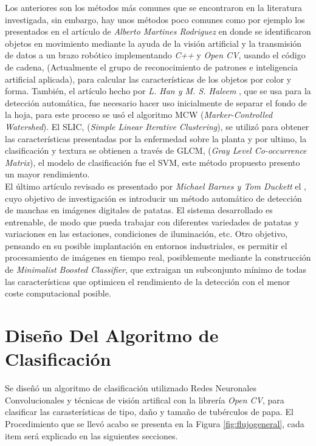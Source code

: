 	Los anteriores son los métodos más comunes que se encontraron en la literatura investigada, sin embargo, hay unos métodos poco comunes como por ejemplo los presentados en el artículo de \textit{Alberto Martines Rodriguez} \cite{article5} en donde se identificaron objetos en movimiento mediante la ayuda de la visión artificial y la transmisión de datos a un brazo robótico implementando \textit{C++} y \textit{Open CV}, usando el código de cadena, (Actualmente el grupo de reconocimiento de patrones e inteligencia artificial aplicada), para calcular las características de los objetos por color y forma. También, el artículo hecho por \textit{L. Han y M. S. Haleem} \cite{7237209}, que se usa para la detección automática, fue necesario hacer uso inicialmente de separar el fondo de la hoja, para este proceso se usó el algoritmo MCW (\textit{Marker-Controlled Watershed}). El SLIC, (\textit{Simple Linear Iterative Clustering}), se utilizó para obtener las características presentadas por la enfermedad sobre la planta y por ultimo, la clasificación y textura se obtienen a través de GLCM, (\textit{Gray Level Co-occurrence Matrix}), el modelo de clasificación fue el SVM, este método propuesto presento un mayor rendimiento.\\
	
	El último artículo revisado es presentado por \textit{Michael Barnes y Tom Duckett} el \cite{Barnes2010}, cuyo objetivo de  investigación es introducir un método automático de detección de manchas en imágenes digitales de patatas. El sistema desarrollado es entrenable, de modo que pueda trabajar con diferentes variedades de patatas y variaciones en las estaciones, condiciones de iluminación, etc. Otro objetivo, pensando en su posible implantación en entornos industriales, es permitir el procesamiento de imágenes en tiempo real, posiblemente mediante la construcción de \textit{Minimalist Boosted Classifier}, que extraigan un subconjunto mínimo de todas las características que optimicen el rendimiento de la detección con el menor coste computacional posible.





\chapter{Diseño Del Algoritmo de Clasificación}


Se diseñó un algoritmo de clasificación utiliznado Redes Neuronales Convolucionales y técnicas de visión artifical con la librería \textit{Open CV}, para clasificar las carasterísticas de tipo, daño y tamaño de tubérculos de papa. El Procedimiento que se llevó acabo se presenta en la Figura \ref{fig:flujogeneral}, cada item será explicado en las siguientes secciones. 



